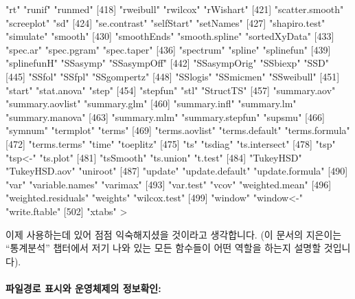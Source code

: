 \begin{Schunk}
\begin{Soutput}
[415] "rt"                   "runif"                "runmed"              
[418] "rweibull"             "rwilcox"              "rWishart"            
[421] "scatter.smooth"       "screeplot"            "sd"                  
[424] "se.contrast"          "selfStart"            "setNames"            
[427] "shapiro.test"         "simulate"             "smooth"              
[430] "smoothEnds"           "smooth.spline"        "sortedXyData"        
[433] "spec.ar"              "spec.pgram"           "spec.taper"          
[436] "spectrum"             "spline"               "splinefun"           
[439] "splinefunH"           "SSasymp"              "SSasympOff"          
[442] "SSasympOrig"          "SSbiexp"              "SSD"                 
[445] "SSfol"                "SSfpl"                "SSgompertz"          
[448] "SSlogis"              "SSmicmen"             "SSweibull"           
[451] "start"                "stat.anova"           "step"                
[454] "stepfun"              "stl"                  "StructTS"            
[457] "summary.aov"          "summary.aovlist"      "summary.glm"         
[460] "summary.infl"         "summary.lm"           "summary.manova"      
[463] "summary.mlm"          "summary.stepfun"      "supsmu"              
[466] "symnum"               "termplot"             "terms"               
[469] "terms.aovlist"        "terms.default"        "terms.formula"       
[472] "terms.terms"          "time"                 "toeplitz"            
[475] "ts"                   "tsdiag"               "ts.intersect"        
[478] "tsp"                  "tsp<-"                "ts.plot"             
[481] "tsSmooth"             "ts.union"             "t.test"              
[484] "TukeyHSD"             "TukeyHSD.aov"         "uniroot"             
[487] "update"               "update.default"       "update.formula"      
[490] "var"                  "variable.names"       "varimax"             
[493] "var.test"             "vcov"                 "weighted.mean"       
[496] "weighted.residuals"   "weights"              "wilcox.test"         
[499] "window"               "window<-"             "write.ftable"        
[502] "xtabs"               
> 
\end{Soutput}
\end{Schunk}

이제 사용하는데 있어 점점 익숙해지셨을 것이라고 생각합니다. (이 문서의 지은이는 ``통계분석'' 챕터에서 저기 나와 있는 모든 함수들이 어떤 역할을 하는지 설명할 것입니다).

\paragraph{파일경로 표시와 운영체제의 정보확인: }

